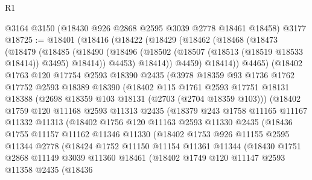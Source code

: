 \begin{lexlean}{R1}
\begin{coremodule}
    @3164
    @3150
    (@18430 @926 @2868 @2595 @3039 @2778 @18461 @18458)
    @3177
@18725 := @18401
    (@18416
      (@18422
        (@18429
          (@18462
            (@18468
              (@18473
                (@18479
                  (@18485
                    (@18490
                      (@18496 (@18502 (@18507 (@18513 (@18519 @18533 @18414)) @3495) @18414))
                      @4453)
                    @18414))
                @4459)
              @18414))
          @4465)
        (@18402
          @1763
          @120
          @17754
          @2593
          @18390
          @2435
          (@3978
            @18359
            @93
            @1736
            @1762
            @17752
            @2593
            @18389
            @18390
            (@18402
              @115
              @1761
              @2593
              @17751
              @18131
              @18388
              (@2698 @18359 @103 @18131 (@2703 (@2704 @18359 @103)))
              (@18402
                @1759
                @120
                @11168
                @2593
                @11313
                @2435
                (@18379
                  @243
                  @1758
                  @11165
                  @11167
                  @11332
                  @11313
                  (@18402
                    @1756
                    @120
                    @11163
                    @2593
                    @11330
                    @2435
                    (@18436
                      @1755
                      @11157
                      @11162
                      @11346
                      @11330
                      (@18402
                        @1753
                        @926
                        @11155
                        @2595
                        @11344
                        @2778
                        (@18424
                          @1752
                          @11150
                          @11154
                          @11361
                          @11344
                          (@18430
                            @1751
                            @2868
                            @11149
                            @3039
                            @11360
                            @18461
                            (@18402
                              @1749
                              @120
                              @11147
                              @2593
                              @11358
                              @2435
                              (@18436

\end{coremodule}
\end{lexlean}
